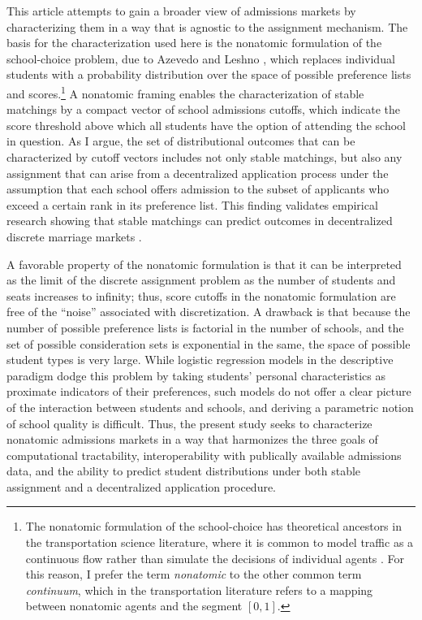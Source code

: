 \documentclass[12pt]{article}
\theoremstyle{definition}
\begin{document}
This article attempts to gain a broader view of admissions markets by characterizing them in a way that is agnostic to the assignment mechanism. The basis for the characterization used here is the nonatomic formulation of the school-choice problem, due to Azevedo and Leshno \parencite*{supplydemandfw}, which replaces individual students with a probability distribution over the space of possible preference lists and scores.\footnote{The nonatomic formulation of the school-choice has theoretical ancestors in the transportation science literature, where it is common to model traffic as a continuous flow rather than simulate the decisions of individual agents \parencite[][]{sometheoreticalaspectsofroadtraffic, theeconomicsofwelfare}. For this reason, I prefer the term \emph{nonatomic} to the other common term \emph{continuum}, which in the transportation literature refers to a mapping between nonatomic agents and the segment $[0,1]$.} A nonatomic framing enables the characterization of stable matchings by a compact vector of school admissions cutoffs, which indicate the score threshold above which all students have the option of attending the school in question. As I argue, the set of distributional outcomes that can be characterized by cutoff vectors includes not only stable matchings, but also any assignment that can arise from a decentralized application process under the assumption that each school offers admission to the subset of applicants who exceed a certain rank in its preference list. This finding validates empirical research showing that stable matchings can predict outcomes in decentralized discrete marriage markets \parencite[][]{marryforwhat, matchingandsortinginonlinedating}. 

A favorable property of the nonatomic formulation is that it can be interpreted as the limit of the discrete assignment problem as the number of students and seats increases to infinity; thus, score cutoffs in the nonatomic formulation are free of the ``noise'' associated with discretization. A drawback is that because the number of possible preference lists is factorial in the number of schools, and the set of possible consideration sets is exponential in the same, the space of possible student types is very large. While logistic regression models in the descriptive paradigm dodge this problem by taking students' personal characteristics as proximate indicators of their preferences, such models do not offer a clear picture of the interaction between students and schools, and deriving a parametric notion of school quality is difficult. Thus, the present study seeks to characterize nonatomic admissions markets in a way that harmonizes the three goals of computational tractability, interoperability with publically available admissions data, and the ability to predict student distributions under both stable assignment and a decentralized application procedure.
\end{document}
